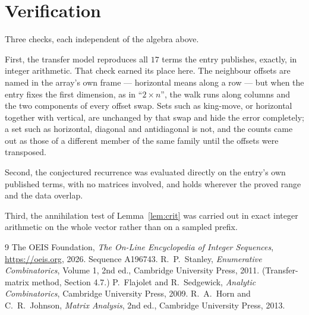 \documentclass[11pt,a4paper]{article}
\theoremstyle{plain}
\theoremstyle{definition}
\begin{document}
\section{Verification}

Three checks, each independent of the algebra above.

First, the transfer model reproduces all $17$ terms the entry publishes, exactly, in
integer arithmetic. That check earned its place here. The neighbour offsets are named in the
array's own frame --- horizontal means along a row --- but when the entry fixes the first
dimension, as in ``$2\times n$'', the walk runs along columns and the two components of every
offset swap. Sets such as king-move, or horizontal together with vertical, are unchanged by
that swap and hide the error completely; a set such as horizontal, diagonal and antidiagonal
is not, and the counts came out as those of a different member of the same family until the
offsets were transposed.

Second, the conjectured recurrence was evaluated directly on the entry's own published terms,
with no matrices involved, and holds wherever the proved range and the data overlap.

Third, the annihilation test of Lemma~\ref{lem:crit} was carried out in exact integer
arithmetic on the whole vector rather than on a sampled prefix.

\begin{thebibliography}{9}
 The OEIS Foundation, \emph{The On-Line Encyclopedia of Integer
Sequences}, \url{https://oeis.org}, 2026. Sequence A196743.
 R.~P.~Stanley, \emph{Enumerative Combinatorics}, Volume 1, 2nd ed.,
Cambridge University Press, 2011. (Transfer-matrix method, Section 4.7.)
 P.~Flajolet and R.~Sedgewick, \emph{Analytic Combinatorics}, Cambridge
University Press, 2009.
 R.~A.~Horn and C.~R.~Johnson, \emph{Matrix Analysis}, 2nd ed., Cambridge
University Press, 2013.
\end{thebibliography}
\end{document}
